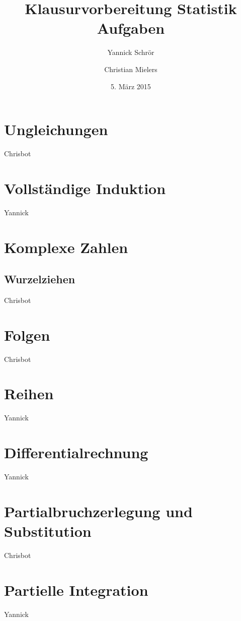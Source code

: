 \documentclass[11pt, a4paper]{article}
\title{Klausurvorbereitung Statistik \\ Aufgaben}
\author{Yannick Schrör \and Christian Mielers}
\date{5. März 2015}
\begin{document}
\maketitle

\section{Ungleichungen}
Chrisbot
\section{Vollständige Induktion}
Yannick
\section{Komplexe Zahlen}
\subsection{Wurzelziehen}
Chrisbot
\section{Folgen}
Chrisbot
\section{Reihen}
Yannick
\section{Differentialrechnung}
Yannick
\section{Partialbruchzerlegung und Substitution}
Chrisbot
\section{Partielle Integration}
Yannick
\end{document}
